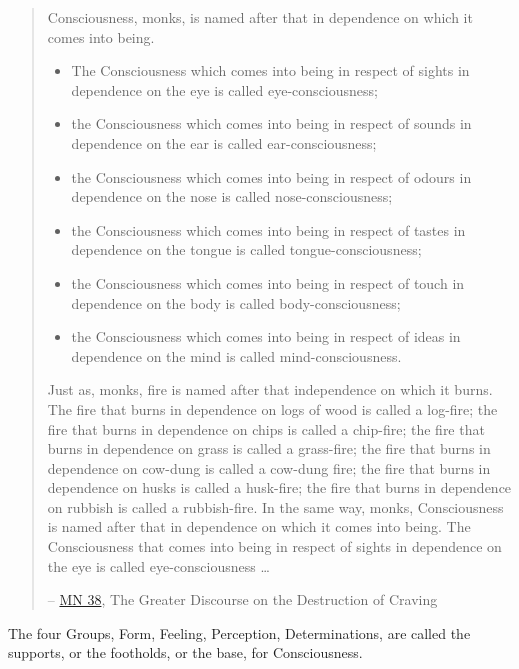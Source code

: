 \begin{quote}
Consciousness, monks, is named after that in dependence on which it comes into being.

\begin{itemize}
\item
  The Consciousness which comes into being in respect of sights in dependence on the eye is called eye-consciousness;
\item
  the Consciousness which comes into being in respect of sounds in dependence on the ear is called ear-consciousness;
\item
  the Consciousness which comes into being in respect of odours in dependence on the nose is called nose-consciousness;
\item
  the Consciousness which comes into being in respect of tastes in dependence on the tongue is called tongue-consciousness;
\item
  the Consciousness which comes into being in respect of touch in dependence on the body is called body-consciousness;
\item
  the Consciousness which comes into being in respect of ideas in dependence on the mind is called mind-consciousness.
\end{itemize}

Just as, monks, fire is named after that independence on which it burns. The fire that burns in dependence on logs of wood is called a log-fire; the fire that burns in dependence on chips is called a chip-fire; the fire that burns in dependence on grass is called a grass-fire; the fire that burns in dependence on cow-dung is called a cow-dung fire; the fire that burns in dependence on husks is called a husk-fire; the fire that burns in dependence on rubbish is called a rubbish-fire. In the same way, monks, Consciousness is named after that in dependence on which it comes into being. The Consciousness that comes into being in respect of sights in dependence on the eye is called eye-consciousness \ldots{}

 -- \href{https://suttacentral.net/mn38/en/bodhi}{MN 38}, The Greater Discourse on the Destruction of Craving
\end{quote}

The four Groups, Form, Feeling, Perception, Determinations, are called the supports, or the footholds, or the base, for Consciousness.

